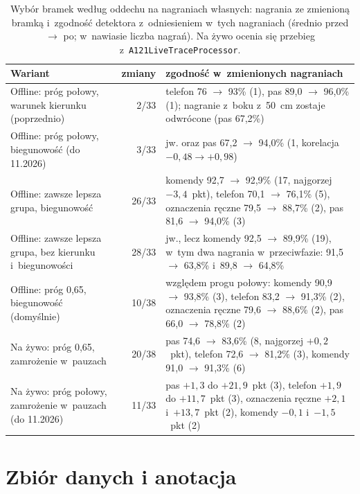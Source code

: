 \documentclass[12pt,a4paper,oneside]{report}
\begin{document}
\begin{table}[H]
\centering
\caption{Wybór bramek według oddechu na nagraniach własnych: nagrania ze
zmienioną bramką i~zgodność detektora z~odniesieniem w~tych nagraniach
(średnio przed $\rightarrow$ po; w~nawiasie liczba nagrań). Na żywo ocenia
się przebieg z~\texttt{A121LiveTraceProcessor}.}
\label{tab:fazy-bramki}
\small
\begin{tabular}{@{}p{5.4cm}rp{7.2cm}@{}}
\toprule
Wariant & zmiany & zgodność w~zmienionych nagraniach \\
\midrule
Offline: próg połowy, warunek kierunku (poprzednio) & 2/33 & telefon 76 $\rightarrow$ 93\% (1), pas 89,0 $\rightarrow$ 96,0\% (1); nagranie z~boku z~\SI{50}{cm} zostaje odwrócone (pas 67,2\%) \\
Offline: próg połowy, biegunowość (do 11.2026) & 3/33 & jw. oraz pas 67,2 $\rightarrow$ 94,0\% (1, korelacja $-0{,}48 \rightarrow +0{,}98$) \\
Offline: zawsze lepsza grupa, biegunowość & 26/33 & komendy 92,7 $\rightarrow$ 92,9\% (17, najgorzej $-3{,}4$~pkt), telefon 70,1 $\rightarrow$ 76,1\% (5), oznaczenia ręczne 79,5 $\rightarrow$ 88,7\% (2), pas 81,6 $\rightarrow$ 94,0\% (3) \\
Offline: zawsze lepsza grupa, bez kierunku i~biegunowości & 28/33 & jw., lecz komendy 92,5 $\rightarrow$ 89,9\% (19), w~tym dwa nagrania w~przeciwfazie: 91,5 $\rightarrow$ 63,8\% i~89,8 $\rightarrow$ 64,8\% \\
Offline: próg 0,65, biegunowość (domyślnie) & 10/38 & względem progu połowy: komendy 90,9 $\rightarrow$ 93,8\% (3), telefon 83,2 $\rightarrow$ 91,3\% (2), oznaczenia ręczne 79,6 $\rightarrow$ 88,6\% (2), pas 66,0 $\rightarrow$ 78,8\% (2) \\
Na żywo: próg 0,65, zamrożenie w~pauzach & 20/38 & pas 74,6 $\rightarrow$ 83,6\% (8, najgorzej $+0{,}2$~pkt), telefon 72,6 $\rightarrow$ 81,2\% (3), komendy 91,0 $\rightarrow$ 91,3\% (6) \\
Na żywo: próg połowy, zamrożenie w~pauzach (do 11.2026) & 11/33 & pas $+1{,}3$ do $+21{,}9$~pkt (3), telefon $+1{,}9$ do $+11{,}7$~pkt (3), oznaczenia ręczne $+2{,}1$ i~$+13{,}7$~pkt (2), komendy $-0{,}1$ i~$-1{,}5$~pkt (2) \\
\bottomrule
\end{tabular}
\end{table}

\section{Zbiór danych i anotacja}
\label{sec:sieci-anotacja}
\end{document}
